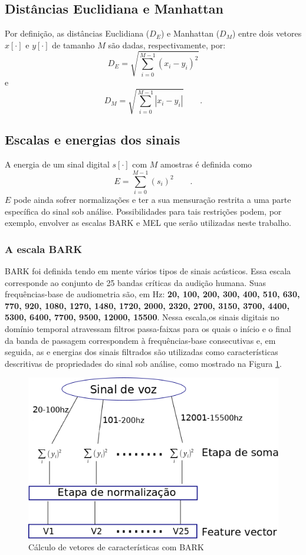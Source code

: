 \subsection{Distâncias Euclidiana e Manhattan}
    \par Por definição, as distâncias Euclidiana ($D_E$) e Manhattan ($D_M$) entre dois vetores $x[\cdot]$ e $y[\cdot]$ de tamanho $M$ são dadas, respectivamente, por:
    \begin{equation}
     D_E = \sqrt{\sum\limits_{i=0}^{M-1}(x_i - y_i)^2}   
    \end{equation}
	e
    \begin{equation}
        D_M = \sqrt{\sum\limits_{i=0}^{M-1}|x_i - y_i|}   
        \qquad. 
    \end{equation}

\subsection{Escalas e energias dos sinais}
	\par A energia de um sinal digital $s[\cdot]$ com $M$ amostras é definida como
	\begin{equation}
	E = \sum\limits_{i=0}^{M-1}(s_i)^2 \qquad.   
	\end{equation}
	$E$ pode ainda sofrer normalizações e ter a sua mensuração restrita a uma parte específica do sinal sob análise. Possibilidades para tais restrições podem, por exemplo, envolver as escalas BARK \cite{doi:10.1121-1.1908630} e MEL \cite{beranek1949acoustic} que serão utilizadas neste trabalho.
	\subsubsection{A escala BARK}
		\par BARK foi definida tendo em mente vários tipos de sinais acústicos. Essa escala corresponde ao conjunto de 25 bandas críticas da audição humana. Suas frequências-base de audiometria são, em Hz: \textbf{20, 100, 200, 300, 400, 510, 630, 770, 920, 1080, 1270, 1480, 1720, 2000, 2320, 2700, 3150, 3700, 4400, 5300, 6400, 7700, 9500, 12000, 15500}. Nessa escala,os sinais digitais no domínio temporal atravessam filtros passa-faixas \cite{XXXXXX} para os quais o início e o final da banda de passagem correspondem à frequências-base consecutivas e, em seguida, as e energias dos sinais filtrados são utilizadas como características descritivas de propriedades do sinal sob análise, como mostrado na Figura \ref{fig:barkfeaturevect}.
		\begin{figure}[h]
			\centering
			\includegraphics[width=0.6\linewidth]{images/barkFeatureVect}
			\caption{Cálculo de vetores de características com BARK}
			\label{fig:barkfeaturevect}
		\end{figure}
